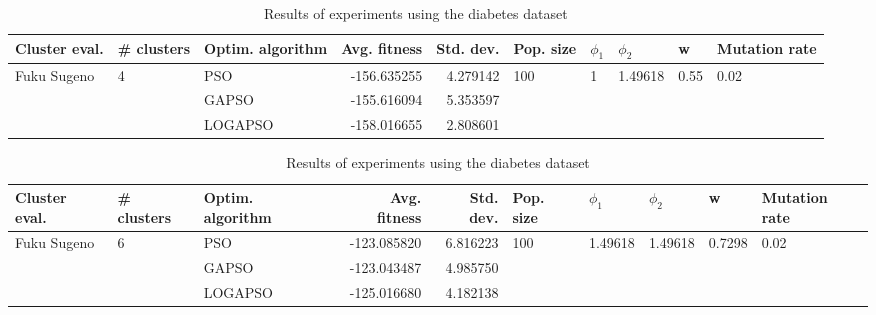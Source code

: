 \documentclass{article}
\begin{document}
\begin{table}
\centering
\caption{Results of experiments using the diabetes dataset}
\begin{tabular}{lllrrlllll}
\toprule
               Cluster eval. &        \# clusters & Optim. algorithm &  Avg. fitness &  Std. dev. &            Pop. size &         $\phi_{1}$ &               $\phi_{2}$ &                     w &         Mutation rate \\
\midrule
\multirow{3}{*}{Fuku Sugeno} & \multirow{3}{*}{4} &              PSO &   -156.635255 &   4.279142 & \multirow{3}{*}{100} & \multirow{3}{*}{1} & \multirow{3}{*}{1.49618} & \multirow{3}{*}{0.55} & \multirow{3}{*}{0.02} \\
                             &                    &            GAPSO &   -155.616094 &   5.353597 &                      &                    &                          &                       &                       \\
                             &                    &          LOGAPSO &   -158.016655 &   2.808601 &                      &                    &                          &                       &                       \\
\bottomrule
\end{tabular}
\end{table}
\begin{table}
\centering
\caption{Results of experiments using the diabetes dataset}
\begin{tabular}{lllrrlllll}
\toprule
               Cluster eval. &        \# clusters & Optim. algorithm &  Avg. fitness &  Std. dev. &            Pop. size &               $\phi_{1}$ &               $\phi_{2}$ &                       w &         Mutation rate \\
\midrule
\multirow{3}{*}{Fuku Sugeno} & \multirow{3}{*}{6} &              PSO &   -123.085820 &   6.816223 & \multirow{3}{*}{100} & \multirow{3}{*}{1.49618} & \multirow{3}{*}{1.49618} & \multirow{3}{*}{0.7298} & \multirow{3}{*}{0.02} \\
                             &                    &            GAPSO &   -123.043487 &   4.985750 &                      &                          &                          &                         &                       \\
                             &                    &          LOGAPSO &   -125.016680 &   4.182138 &                      &                          &                          &                         &                       \\
\bottomrule
\end{tabular}
\end{table}
\end{document}
